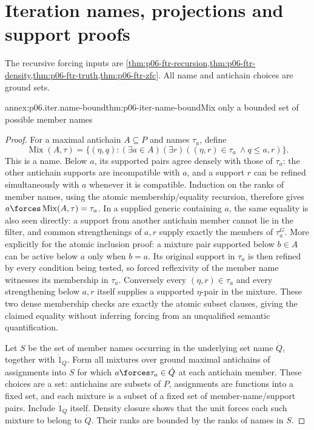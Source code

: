 \section{Iteration names, projections and support proofs}
\label{annex:p06-forcing-iterations-support}

The recursive forcing inputs are
\cref{thm:p06-ftr-recursion,thm:p06-ftr-density,thm:p06-ftr-truth,thm:p06-ftr-zfc}.
All name and antichain choices are ground sets.

\begin{annexitem}{annex:p06.iter.name-bound}{thm:p06-iter-name-bound}{Mix only a bounded set of possible member names}
\begin{proof}
For a maximal antichain \(A\subseteq P\) and names \(\tau_a\), define
\[
 \operatorname{Mix}(A,\tau)=
 \{(\eta,q):(\exists a\in A)(\exists r)
       ((\eta,r)\in\tau_a\ \land q\leq a,r)\}.
\]
This is a name. Below \(a\), its supported pairs agree densely with
those of \(\tau_a\): the other antichain supports are incompatible
with \(a\), and a support \(r\) can be refined simultaneously with
\(a\) whenever it is compatible. Induction on the ranks of member
names, using the atomic membership/equality recursion, therefore gives
\(a\forces\operatorname{Mix}(A,\tau)=\tau_a\). In a supplied generic
containing \(a\), the same equality is also seen directly: a support
from another antichain member cannot lie in the filter, and common
strengthenings of \(a,r\) supply exactly the members of \(\tau_a^G\).
More explicitly for the atomic inclusion proof: a mixture pair supported
below \(b\in A\) can be active below \(a\) only when \(b=a\).
Its original support in \(\tau_a\) is then refined by every condition
being tested, so forced reflexivity of the member name witnesses its
membership in \(\tau_a\). Conversely every \((\eta,r)\in\tau_a\)
and every strengthening below \(a,r\) itself supplies a supported
\(\eta\)-pair in the mixture. These two dense membership checks are
exactly the atomic subset clauses, giving the claimed equality without
inferring forcing from an unqualified semantic quantification.

Let \(S\) be the set of member names occurring in the underlying set
name \(\dot Q\), together with \(\dot1_Q\). Form all mixtures over
ground maximal antichains of assignments into \(S\) for which
\(a\forces\tau_a\in\dot Q\) at each antichain member. These choices
are a set: antichains are subsets of \(P\), assignments are functions
into a fixed set, and each mixture is a subset of a fixed set of
member-name/support pairs. Include \(\dot1_Q\) itself. Density closure
shows that the unit forces each such mixture to belong to \(\dot Q\).
Their ranks are bounded by the ranks of names in \(S\).


\end{proof}
\end{annexitem}
